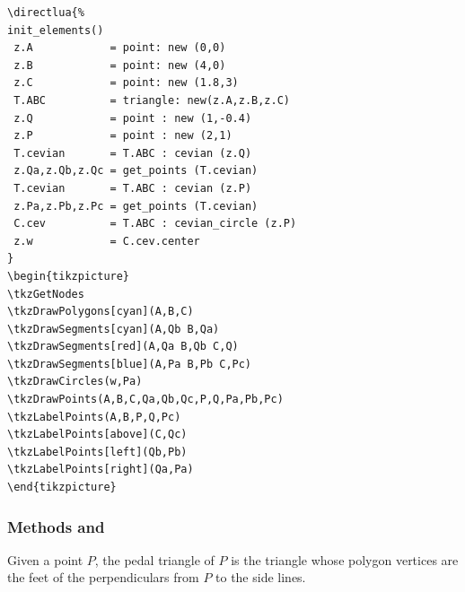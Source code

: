 \begin{minipage}{.5\textwidth}
\begin{Verbatim}
\directlua{%
init_elements()
 z.A            = point: new (0,0)
 z.B            = point: new (4,0)
 z.C            = point: new (1.8,3)
 T.ABC          = triangle: new(z.A,z.B,z.C)
 z.Q            = point : new (1,-0.4) 
 z.P            = point : new (2,1) 
 T.cevian       = T.ABC : cevian (z.Q)
 z.Qa,z.Qb,z.Qc = get_points (T.cevian)
 T.cevian       = T.ABC : cevian (z.P)
 z.Pa,z.Pb,z.Pc = get_points (T.cevian)
 C.cev          = T.ABC : cevian_circle (z.P)
 z.w            = C.cev.center
}
\begin{tikzpicture}
\tkzGetNodes
\tkzDrawPolygons[cyan](A,B,C)
\tkzDrawSegments[cyan](A,Qb B,Qa)
\tkzDrawSegments[red](A,Qa B,Qb C,Q)
\tkzDrawSegments[blue](A,Pa B,Pb C,Pc)
\tkzDrawCircles(w,Pa)
\tkzDrawPoints(A,B,C,Qa,Qb,Qc,P,Q,Pa,Pb,Pc)
\tkzLabelPoints(A,B,P,Q,Pc)
\tkzLabelPoints[above](C,Qc)
\tkzLabelPoints[left](Qb,Pb)
\tkzLabelPoints[right](Qa,Pa)
\end{tikzpicture}
\end{Verbatim}
\end{minipage}



\subsubsection{Methods  and } %
\label{ssub:method_imeth_triangle_pedal}

Given a point $P$, the pedal triangle of $P$ is the triangle whose polygon vertices are the feet of the perpendiculars from $P$ to the side lines. 

